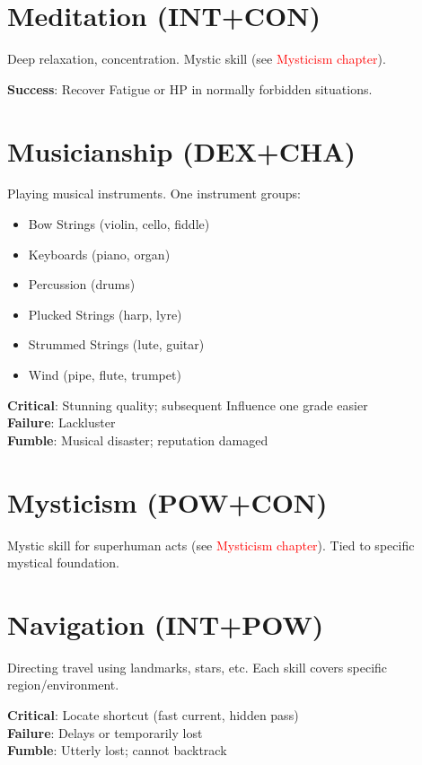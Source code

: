 \documentclass[10pt]{article}
\begin{document}
\section{Meditation (INT+CON)}
\label{skill:meditation}

Deep relaxation, concentration. Mystic skill (see \textcolor{red}{Mysticism chapter}).

\textbf{Success}: Recover Fatigue or HP in normally forbidden situations.

\section{Musicianship (DEX+CHA)}
\label{skill:musicianship}

Playing musical instruments. One instrument groups:

\begin{itemize}
    \item Bow Strings (violin, cello, fiddle)
    \item Keyboards (piano, organ)
    \item Percussion (drums)
    \item Plucked Strings (harp, lyre)
    \item Strummed Strings (lute, guitar)
    \item Wind (pipe, flute, trumpet)
\end{itemize}

\textbf{Critical}: Stunning quality; subsequent Influence one grade easier\\
\textbf{Failure}: Lackluster\\
\textbf{Fumble}: Musical disaster; reputation damaged

\section{Mysticism (POW+CON)}
\label{skill:mysticism}

Mystic skill for superhuman acts (see \textcolor{red}{Mysticism chapter}). Tied to specific mystical foundation.

\section{Navigation (INT+POW)}
\label{skill:navigation}

Directing travel using landmarks, stars, etc. Each skill covers specific region/environment.

\textbf{Critical}: Locate shortcut (fast current, hidden pass)\\
\textbf{Failure}: Delays or temporarily lost\\
\textbf{Fumble}: Utterly lost; cannot backtrack
\end{document}
